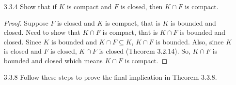 \documentclass[12pt,letterpaper]{article}
\begin{document}
\begin{itemize}[leftmargin=!,labelindent=5pt]
\begin{itemize}
                (i) The union of a finite collection of closed sets is closed.
                    \begin{proof}
                        Suppose $\{E_\lambda : \lambda \in \Lambda\}$ is a collection of closed sets.
                        Then, $\{E_\lambda : \lambda \in \Lambda\}^c$ is a collection of open sets and we know that the intersection of a finite amount of open sets is open (Theorem 3.2.3).
                        So, taking the complement again $(\{E_\lambda : \lambda \in \Lambda\}^c)^c = \{E_\lambda : \lambda \in \Lambda\}$ gives us a closed set (since the complement of an open set is a closed set) as desired.
                    \end{proof}
                (ii) The intersection of an arbitrary collection of closed sets is closed.
                    \begin{proof}
                        Suppose $\{E_\lambda : \lambda \in \Lambda\}$ is an arbitrary collection of closed sets.
                        Then, $E_{\lambda}^c$ is open and $\forall \lambda \in \Lambda$, the union of $E_{\lambda}^c$ is open (Theorem 3.2.3).
                        By De Morgan's Law, we know $\bigcup_{\lambda \in \Lambda} E_{\lambda}^c = (\bigcap_{\lambda \in \Lambda} E_\lambda)^c$ so $(\bigcap_{\lambda \in \Lambda} E_\lambda)^c$ is open.
                        Then, $\bigcap_{\lambda \in \Lambda} E_\lambda$ is closed.
                        Thus, the intersection of an arbitrary collection of closed sets is closed.
                    \end{proof}
            \end{itemize}
        \item [3.3.4] Show that if $K$ is compact and $F$ is closed, then $K \cap F$ is compact.
        
            \begin{proof}
                Suppose $F$ is closed and $K$ is compact, that is $K$ is bounded and closed.
                Need to show that $K \cap F$ is compact, that is $K \cap F$ is bounded and closed.
                Since $K$ is bounded and $K \cap F \subseteq K$, $K \cap F$ is bounded.
                Also, since $K$ is closed and $F$ is closed, $K \cap F$ is closed (Theorem 3.2.14).
                So, $K \cap F$ is bounded and closed which means $K \cap F$ is compact.
            \end{proof}
        \item [3.3.8] Follow these steps to prove the final implication in Theorem 3.3.8.
            

\end{itemize}
\end{document}
